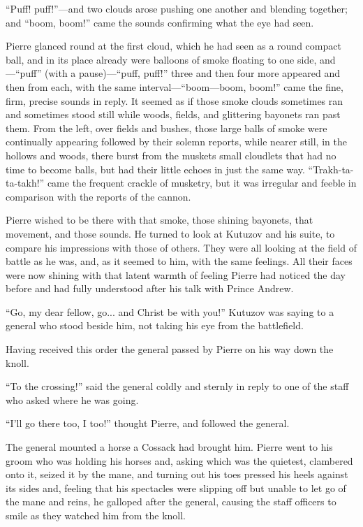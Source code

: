 ``Puff! puff!''---and two clouds arose pushing one another and
blending together; and ``boom, boom!'' came the sounds confirming
what the eye had seen.

Pierre glanced round at the first cloud, which he had seen as a
round compact ball, and in its place already were balloons of
smoke floating to one side, and---``puff'' (with a
pause)---``puff, puff!'' three and then four more appeared and
then from each, with the same interval---``boom---boom, boom!''
came the fine, firm, precise sounds in reply. It seemed as if
those smoke clouds sometimes ran and sometimes stood still while
woods, fields, and glittering bayonets ran past them. From the
left, over fields and bushes, those large balls of smoke were
continually appearing followed by their solemn reports, while
nearer still, in the hollows and woods, there burst from the
muskets small cloudlets that had no time to become balls, but had
their little echoes in just the same way. ``Trakh-ta-ta-takh!''
came the frequent crackle of musketry, but it was irregular and
feeble in comparison with the reports of the cannon.

Pierre wished to be there with that smoke, those shining
bayonets, that movement, and those sounds. He turned to look at
Kutuzov and his suite, to compare his impressions with those of
others. They were all looking at the field of battle as he was,
and, as it seemed to him, with the same feelings. All their faces
were now shining with that latent warmth of feeling Pierre had
noticed the day before and had fully understood after his talk
with Prince Andrew.

``Go, my dear fellow, go... and Christ be with you!'' Kutuzov was
saying to a general who stood beside him, not taking his eye from
the battlefield.

Having received this order the general passed by Pierre on his
way down the knoll.

``To the crossing!'' said the general coldly and sternly in reply
to one of the staff who asked where he was going.

``I'll go there too, I too!'' thought Pierre, and followed the
general.

The general mounted a horse a Cossack had brought him. Pierre
went to his groom who was holding his horses and, asking which
was the quietest, clambered onto it, seized it by the mane, and
turning out his toes pressed his heels against its sides and,
feeling that his spectacles were slipping off but unable to let
go of the mane and reins, he galloped after the general, causing
the staff officers to smile as they watched him from the knoll.

